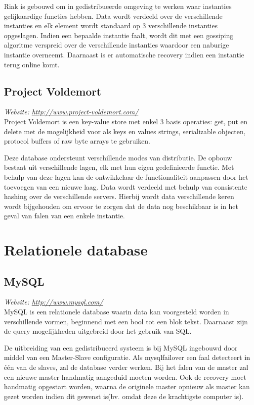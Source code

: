 Riak is gebouwd om in gedistribueerde omgeving te werken waar instanties gelijkaardige functies hebben. Data wordt verdeeld over de verschillende instanties en elk element wordt standaard op 3 verschillende instanties opgeslagen. Indien een bepaalde instantie faalt, wordt dit met een gossiping algoritme verspreid over de verschillende instanties waardoor een naburige instantie overneemt. Daarnaast is er automatische recovery indien een instantie terug online komt. 

\subsection{Project Voldemort}
\textit{Website: \url{http://www.project-voldemort.com/}}\\
Project Voldemort is een key-value store met enkel 3 basis operaties: get, put en delete met de mogelijkheid voor als keys en values strings, serializable objecten, protocol buffers of raw byte arrays te gebruiken. 

Deze database ondersteunt verschillende modes van distributie. De opbouw bestaat uit verschillende lagen, elk met hun eigen gedefinieerde functie. Met behulp van deze lagen kan de ontwikkelaar de functionaliteit aanpassen door het toevoegen van een nieuwe laag. 
Data wordt verdeeld met behulp van consistente hashing over de verschillende servers. Hierbij wordt data verschillende keren wordt bijgehouden om ervoor te zorgen dat de data nog beschikbaar is in het geval van falen van een enkele instantie. 

\section{Relationele database}
\subsection{MySQL}
\textit{Website: \url{http://www.mysql.com/}}\\
MySQL is een relationele database waarin data kan voorgesteld worden in verschillende vormen, beginnend met een bool tot een blok tekst. Daarnaast zijn de query mogelijkheden uitgebreid door het gebruik van SQL.  

De uitbreiding van een gedistribueerd systeem is bij MySQL ingebouwd door middel van een Master-Slave configuratie. Als mysqlfailover een faal detecteert in één van de slaves, zal de database verder werken. Bij het falen van de master zal een nieuwe master handmatig aangeduid moeten worden. Ook de recovery moet handmatig opgestart worden, waarna de originele master opnieuw als master kan gezet worden indien dit gewenst is(bv. omdat deze de krachtigste computer is). 

